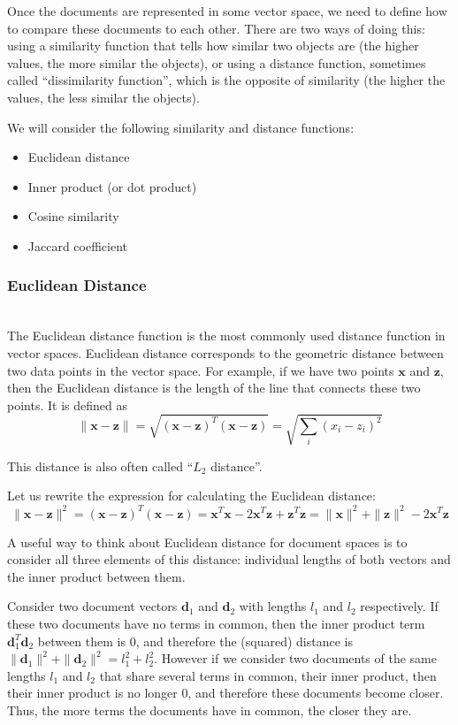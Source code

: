 Once the documents are represented in some vector space, we need to
define how to compare these documents to each other. There are two
ways of doing this: using a similarity function that tells how similar
two objects are (the higher values, the more similar the objects),
or using a distance function, sometimes called ``dissimilarity function'',
which is the opposite of similarity (the higher the values, the less similar
the objects).

We will consider the following similarity and distance functions:


\begin{itemize}\itemsep1pt\parskip0pt
  \item Euclidean distance
  \item Inner product (or dot product)
  \item Cosine similarity
  \item Jaccard coefficient
\end{itemize}


\subsubsection{Euclidean Distance} \ \\

The Euclidean distance function is the most commonly used distance
function in vector spaces. Euclidean distance corresponds to
the geometric distance between two data points in the vector space.
For example, if we have two points $\mathbf x$ and
$\mathbf z$, then the Euclidean distance is the
length of the line that connects these two points.
It is defined as
$$\| \mathbf x - \mathbf z \| = \sqrt{ (\mathbf x - \mathbf z)^T (\mathbf x - \mathbf z) } = \sqrt{\sum_i (x_i - z_i)^2}$$

This distance is also often called ``$L_2$ distance''.


Let us rewrite the expression for calculating the Euclidean distance:
$$\| \mathbf x - \mathbf z \|^2 = (\mathbf x - \mathbf z)^T (\mathbf x - \mathbf z) =
\mathbf x^T \mathbf x - 2 \mathbf x^T \mathbf z + \mathbf z^T \mathbf z =
\| \mathbf x \|^2 + \| \mathbf z \|^2 - 2 \mathbf x^T \mathbf z$$

A useful way to think about Euclidean distance for document spaces
is to consider all three elements of this distance: individual
lengths of both vectors and the inner product between them.

Consider two document vectors $\mathbf d_1$ and $\mathbf d_2$ with lengths
$l_1$ and $l_2$ respectively. If these two documents have
no terms in common, then the inner product term $\mathbf d_1^T \mathbf d_2$
between them is 0, and therefore the (squared) distance is
$\| \mathbf d_1 \|^2 + \| \mathbf d_2 \|^2 = l_1^2 + l_2^2$.
However if we consider two documents of the same lengths
$l_1$ and $l_2$ that share several terms in common,
their inner product, then their inner product is no longer 0,
and therefore these documents become closer. Thus, the more terms
the documents have in common, the closer they are.


